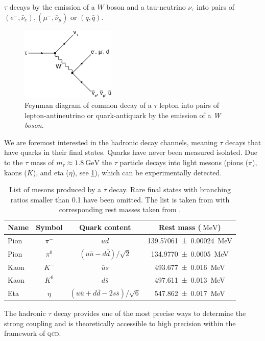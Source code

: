 \documentclass[../../index.tex]{subfiles}
\begin{document}
\(\tau\) decays by the emission of a \(W\) boson and a tau-neutrino \(\nu_\tau\)
into pairs of \((e^-, \bar\nu_e), (\mu^-, \bar\nu_\mu)\) or \((q, \bar q)\).
\begin{figure}
  \centering \includegraphics[width=0.4\textwidth]{images/tauDecay.eps}
  \caption{Feynman diagram of common decay of a \(\tau\) lepton into pairs of
    lepton-antineutrino or quark-antiquark by the emission of a \textit{W
      boson}.}
  \label{fig:tauDecay}
\end{figure}
We are foremost interested in the hadronic decay channels, meaning \(\tau\)
decays that have quarks in their final states. Quarks have never been measured
isolated. Due to the \(\tau\) mass of \(m_\tau \approx
\SI{1.8}{\giga\electronvolt}\) the \(\tau\) particle decays into light mesons
(pions (\(\pi\)), kaons (\(K\)), and eta (\(\eta\)), see
\cref{table:lightMesons}), which can be experimentally detected.
\begin{table}
  \centering
  \begin{tabular}{lccc}
    \toprule
    Name & Symbol & Quark content & Rest mass (\(\SI{}{\mega\electronvolt}\)) \\
    \midrule
    Pion & \(\pi^-\) & \(\bar u d\) & \SI{139.57061 \pm 0.00024}{\mega\electronvolt}  \\
    Pion & \(\pi^0\) & \((u \bar u - d \bar d)/\sqrt{2}\) & \SI{134.9770\pm0.0005}{\mega\electronvolt} \\
    Kaon & \(K^-\) & \(\bar u s\) & \SI{493.677\pm0.016}{\mega\electronvolt} \\
    Kaon & \(K^0\) & \(d \bar s\) & \SI{497.611\pm0.013}{\mega\electronvolt} \\
    Eta & \(\eta\) & \((u \bar u + d \bar d - 2 s \bar s)/\sqrt{6}\) & \SI{547.862\pm0.017}{\mega\electronvolt} \\
  \end{tabular}
  \caption{List of mesons produced by a \(\tau\) decay. Rare final states with
    branching ratios smaller than 0.1 have been omitted. The list is taken from
    \cite{Davier2006} with corresponding rest masses taken from \cite{PDG2018}.}
  \label{table:lightMesons}
\end{table}
The hadronic \(\tau\) decay provides one of the most precise ways to determine
the strong coupling \cite{Pich2016} and is theoretically accessible to high
precision within the framework of \textsc{qcd}.
\end{document}

